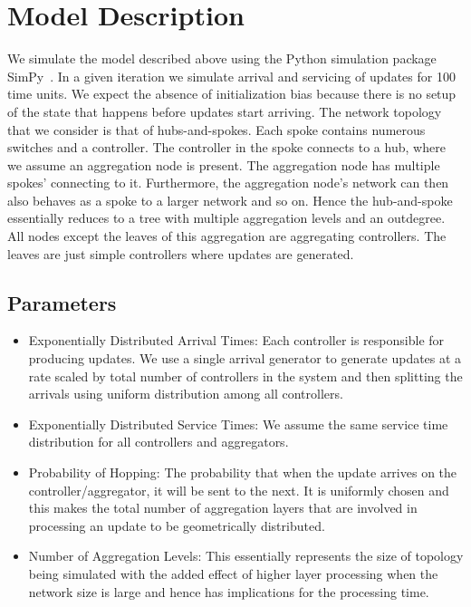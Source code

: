 \documentclass[conference]{IEEEtran}
\begin{document}


\section{Model Description}
We simulate the model described above using the Python simulation package SimPy~\cite{simpy}. In a given iteration we simulate arrival and servicing of updates for 100 time units. We expect the absence of initialization bias because there is no setup of the state that happens before updates start arriving. The network topology that we consider is that of hubs-and-spokes. Each spoke contains numerous switches and a controller. The controller in the spoke connects to a hub, where we assume an aggregation node is present. The aggregation node has multiple spokes' connecting to it. Furthermore, the aggregation node's network can then also behaves as a spoke to a larger network and so on. Hence the hub-and-spoke essentially reduces to a tree with multiple aggregation levels and an outdegree. All nodes except the leaves of this aggregation are aggregating controllers. The leaves are just simple controllers where updates are generated. 

\subsection{Parameters}
\begin{itemize}
 \item Exponentially Distributed Arrival Times: Each controller is responsible for producing updates. We use a single arrival generator to generate updates at a rate scaled by total number of controllers in the system and then splitting the arrivals using uniform distribution among all controllers.
 \item Exponentially Distributed Service Times: We assume the same service time distribution for all controllers and aggregators. 
 \item Probability of Hopping: The probability that when the update arrives on the controller/aggregator, it will be sent to the next. It is uniformly chosen and this makes the total number of aggregation layers that are involved in processing an update to be geometrically distributed.
 \item Number of Aggregation Levels: This essentially represents the size of topology being simulated with the added effect of higher layer processing when the network size is large and hence has implications for the processing time.
 
 \end{itemize}
\end{document}
